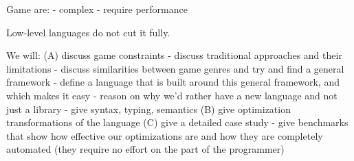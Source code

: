 
Game are:
- complex
- require performance

Low-level languages do not cut it fully.

We will:
(A) discuss game constraints
  - discuss traditional approaches and their limitations
  - discuss similarities between game genres and try and find a general framework
  - define a language that is built around this general framework, and which makes it easy
  - reason on why we'd rather have a new language and not just a library
  - give syntax, typing, semantics
(B) give optimization transformations of the language
(C) give a detailed case study
  - give benchmarks that show how effective our optimizations are and how they are completely automated (they require no effort on the part of the programmer)